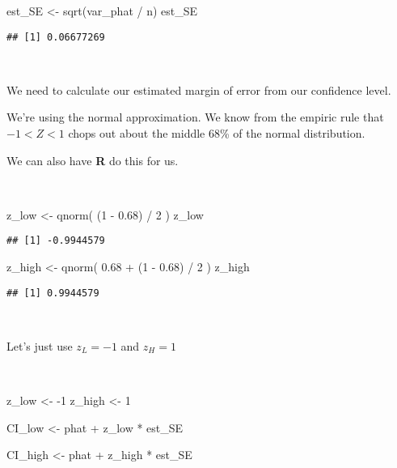 \documentclass[
]{article}
\newenvironment{Shaded}{\begin{snugshade}}{\end{snugshade}}
\newcommand{\DecValTok}[1]{\textcolor[rgb]{0.00,0.00,0.81}{#1}}
\newcommand{\FloatTok}[1]{\textcolor[rgb]{0.00,0.00,0.81}{#1}}
\newcommand{\FunctionTok}[1]{\textcolor[rgb]{0.00,0.00,0.00}{#1}}
\newcommand{\NormalTok}[1]{#1}
\newcommand{\OtherTok}[1]{\textcolor[rgb]{0.56,0.35,0.01}{#1}}
\newcommand{\SpecialCharTok}[1]{\textcolor[rgb]{0.00,0.00,0.00}{#1}}
\begin{document}
\begin{Shaded}
\begin{Highlighting}[]
\NormalTok{est\_SE }\OtherTok{\textless{}{-}} \FunctionTok{sqrt}\NormalTok{(var\_phat }\SpecialCharTok{/}\NormalTok{ n)}
\NormalTok{est\_SE}
\end{Highlighting}
\end{Shaded}

\begin{verbatim}
## [1] 0.06677269
\end{verbatim}

~~

We need to calculate our estimated margin of error from our confidence
level.

We're using the normal approximation. We know from the empiric rule that
\(-1 < Z < 1\) chops out about the middle 68\% of the normal
distribution.

We can also have \textbf{R} do this for us.

~~

\begin{Shaded}
\begin{Highlighting}[]
\NormalTok{z\_low }\OtherTok{\textless{}{-}} \FunctionTok{qnorm}\NormalTok{( (}\DecValTok{1} \SpecialCharTok{{-}} \FloatTok{0.68}\NormalTok{) }\SpecialCharTok{/} \DecValTok{2}\NormalTok{ )}
\NormalTok{z\_low}
\end{Highlighting}
\end{Shaded}

\begin{verbatim}
## [1] -0.9944579
\end{verbatim}

\begin{Shaded}
\begin{Highlighting}[]
\NormalTok{z\_high }\OtherTok{\textless{}{-}} \FunctionTok{qnorm}\NormalTok{( }\FloatTok{0.68} \SpecialCharTok{+}\NormalTok{ (}\DecValTok{1} \SpecialCharTok{{-}} \FloatTok{0.68}\NormalTok{) }\SpecialCharTok{/} \DecValTok{2}\NormalTok{ )}
\NormalTok{z\_high}
\end{Highlighting}
\end{Shaded}

\begin{verbatim}
## [1] 0.9944579
\end{verbatim}

~~

Let's just use \(z_{L} = -1\) and \(z_{H} = 1\)

~~

\begin{Shaded}
\begin{Highlighting}[]
\NormalTok{z\_low }\OtherTok{\textless{}{-}} \SpecialCharTok{{-}}\DecValTok{1}
\NormalTok{z\_high }\OtherTok{\textless{}{-}} \DecValTok{1}

\NormalTok{CI\_low }\OtherTok{\textless{}{-}}\NormalTok{ phat }\SpecialCharTok{+}\NormalTok{ z\_low }\SpecialCharTok{*}\NormalTok{ est\_SE}

\NormalTok{CI\_high }\OtherTok{\textless{}{-}}\NormalTok{ phat }\SpecialCharTok{+}\NormalTok{ z\_high }\SpecialCharTok{*}\NormalTok{ est\_SE}
\end{Highlighting}
\end{Shaded}
\end{document}

